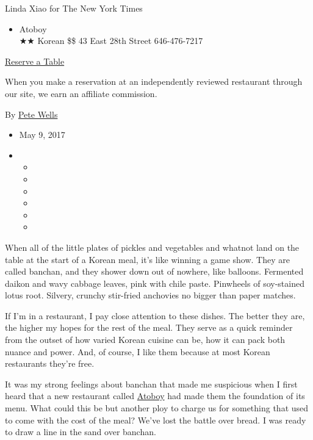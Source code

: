 Linda Xiao for The New York Times

\begin{itemize}
\tightlist
\item
  Atoboy\\
  ★★ Korean \$\$ 43 East 28th Street 646-476-7217
\end{itemize}

\href{https://resy.com/cities/ny/atoboy?utm_source=nyt\&utm_medium=restoprofile\&utm_campaign=affiliates\&aff_id=c1fe784}{Reserve
a Table}

When you make a reservation at an independently reviewed restaurant
through our site, we earn an affiliate commission.

By \href{http://www.nytimes3xbfgragh.onion/by/pete-wells}{Pete Wells}

\begin{itemize}
\item
  May 9, 2017
\item
  \begin{itemize}
  \item
  \item
  \item
  \item
  \item
  \item
  \end{itemize}
\end{itemize}

When all of the little plates of pickles and vegetables and whatnot land
on the table at the start of a Korean meal, it's like winning a game
show. They are called banchan, and they shower down out of nowhere, like
balloons. Fermented daikon and wavy cabbage leaves, pink with chile
paste. Pinwheels of soy-stained lotus root. Silvery, crunchy stir-fried
anchovies no bigger than paper matches.

If I'm in a restaurant, I pay close attention to these dishes. The
better they are, the higher my hopes for the rest of the meal. They
serve as a quick reminder from the outset of how varied Korean cuisine
can be, how it can pack both nuance and power. And, of course, I like
them because at most Korean restaurants they're free.

It was my strong feelings about banchan that made me suspicious when I
first heard that a new restaurant called
\href{http://atoboynyc.com/}{Atoboy} had made them the foundation of its
menu. What could this be but another ploy to charge us for something
that used to come with the cost of the meal? We've lost the battle over
bread. I was ready to draw a line in the sand over banchan.

